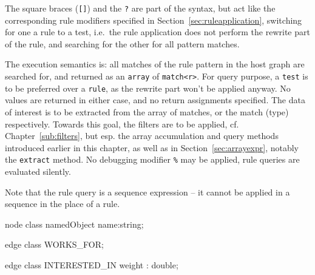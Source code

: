 The square braces (\texttt{[]}) and the \texttt{?} are part of the syntax, but act like the corresponding rule modifiers specified in Section~\ref{sec:ruleapplication}, switching for one a rule to a test, i.e.\ the rule application does not perform the rewrite part of the rule, and searching for the other for all pattern matches.

The execution semantics is: all matches of the rule pattern in the host graph are searched for, and returned as an \texttt{array} of \texttt{match<r>}.
For query purpose, a \texttt{test} is to be preferred over a \texttt{rule}, as the rewrite part won't be applied anyway. 
No values are returned in either case, and no return assignments specified.
The data of interest is to be extracted from the array of matches, or the match (type) respectively.
Towards this goal, the filters are to be applied, cf. Chapter~\ref{sub:filters}, but esp. the array accumulation and query methods introduced earlier in this chapter, as well as in Section~\ref{sec:arrayexpr}, notably the \texttt{extract} method.
No debugging modifier \texttt{\%} may be applied, rule queries are evaluated silently.

Note that the rule query is a sequence expression -- it cannot be applied in a sequence in the place of a rule.

\begin{example}
  \begin{grgen}
node class namedObject
{
	name:string;
}

edge class WORKS_FOR;

edge class INTERESTED_IN
{
	weight : double;
}
  \end{grgen}
\end{example}


